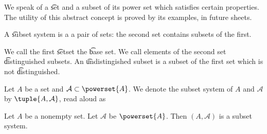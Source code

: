 

We speak of a \t{set} and a subset of its power set which satisfies certain properties.
The utility of this abstract concept is proved by its examples, in future sheets.


A \t{subset system} is a a pair of sets: the second set contains subsets of the first.

We call the first \t{set}{set} the \t{base set}.
We call elements of the second set \t{distinguished subsets}.
An \t{undistingished subset} is a subset of the first set which is not \t{distinguished}.



Let $A$ be a set and $\mathcal{A} \subset \powerset{A}$.
We denote the subset system of $A$ and $\mathcal{A}$
by $\tuple{A, \mathcal{A}}$, read aloud as 


\begin{expl}
Let $A$ be a nonempty set.
Let $\mathcal{A}$ be $\powerset{A}$.
Then $(A, \mathcal{A})$ is a subset system.
\end{expl}
